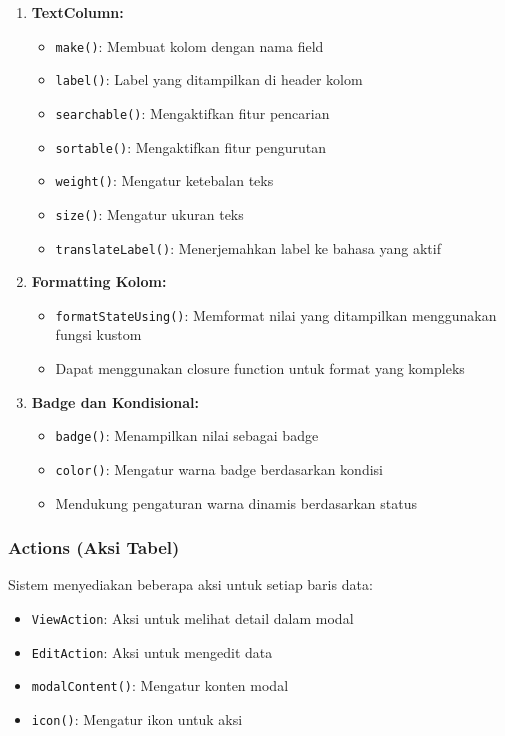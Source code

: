 \documentclass[a4paper]{report}
\begin{document}
\begin{enumerate}
\item \textbf{TextColumn:}
    \begin{itemize}
    \item \texttt{make()}: Membuat kolom dengan nama field
    \item \texttt{label()}: Label yang ditampilkan di header kolom
    \item \texttt{searchable()}: Mengaktifkan fitur pencarian
    \item \texttt{sortable()}: Mengaktifkan fitur pengurutan
    \item \texttt{weight()}: Mengatur ketebalan teks
    \item \texttt{size()}: Mengatur ukuran teks
    \item \texttt{translateLabel()}: Menerjemahkan label ke bahasa yang aktif
    \end{itemize}

\item \textbf{Formatting Kolom:}
    \begin{itemize}
    \item \texttt{formatStateUsing()}: Memformat nilai yang ditampilkan menggunakan fungsi kustom
    \item Dapat menggunakan closure function untuk format yang kompleks
    \end{itemize}

\item \textbf{Badge dan Kondisional:}
    \begin{itemize}
    \item \texttt{badge()}: Menampilkan nilai sebagai badge
    \item \texttt{color()}: Mengatur warna badge berdasarkan kondisi
    \item Mendukung pengaturan warna dinamis berdasarkan status
    \end{itemize}
\end{enumerate}

\subsubsection{Actions (Aksi Tabel)}
Sistem menyediakan beberapa aksi untuk setiap baris data:
\begin{itemize}
\item \texttt{ViewAction}: Aksi untuk melihat detail dalam modal
\item \texttt{EditAction}: Aksi untuk mengedit data
\item \texttt{modalContent()}: Mengatur konten modal
\item \texttt{icon()}: Mengatur ikon untuk aksi
\end{itemize}
\end{document}
